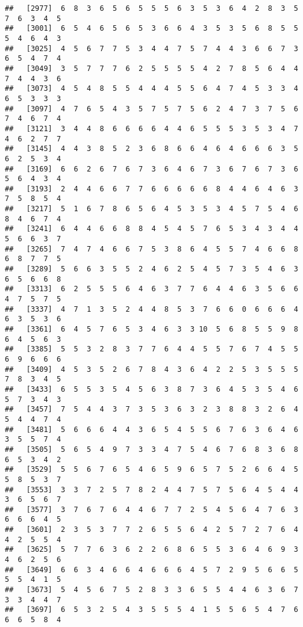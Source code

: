 \documentclass[
]{book}
\begin{document}
\begin{verbatim}
##   [2977]  6  8  3  6  5  6  5  5  5  6  3  5  3  6  4  2  8  3  5  7  6  3  4  5
##   [3001]  6  5  4  6  5  6  5  3  6  6  4  3  5  3  5  6  8  5  5  5  4  6  4  3
##   [3025]  4  5  6  7  7  5  3  4  4  7  5  7  4  4  3  6  6  7  3  6  5  4  7  4
##   [3049]  3  5  7  7  7  6  2  5  5  5  5  4  2  7  8  5  6  4  4  7  4  4  3  6
##   [3073]  4  5  4  8  5  5  4  4  4  5  5  6  4  7  4  5  3  3  4  6  5  3  3  3
##   [3097]  4  7  6  5  4  3  5  7  5  7  5  6  2  4  7  3  7  5  6  7  4  6  7  4
##   [3121]  3  4  4  8  6  6  6  6  4  4  6  5  5  5  3  5  3  4  7  4  6  2  7  7
##   [3145]  4  4  3  8  5  2  3  6  8  6  6  4  6  4  6  6  6  3  5  6  2  5  3  4
##   [3169]  6  6  2  6  7  6  7  3  6  4  6  7  3  6  7  6  7  3  6  5  6  4  3  4
##   [3193]  2  4  4  6  6  7  7  6  6  6  6  6  8  4  4  6  4  6  3  7  5  8  5  4
##   [3217]  5  1  6  7  8  6  5  6  4  5  3  5  3  4  5  7  5  4  6  8  4  6  7  4
##   [3241]  6  4  4  6  6  8  8  4  5  4  5  7  6  5  3  4  3  4  4  5  6  6  3  7
##   [3265]  7  4  7  4  6  6  7  5  3  8  6  4  5  5  7  4  6  6  8  6  8  7  7  5
##   [3289]  5  6  6  3  5  5  2  4  6  2  5  4  5  7  3  5  4  6  3  6  5  6  6  8
##   [3313]  6  2  5  5  5  6  4  6  3  7  7  6  4  4  6  3  5  6  6  4  7  5  7  5
##   [3337]  4  7  1  3  5  2  4  4  8  5  3  7  6  6  0  6  6  6  4  6  3  5  3  6
##   [3361]  6  4  5  7  6  5  3  4  6  3  3 10  5  6  8  5  5  9  8  6  4  5  6  3
##   [3385]  5  5  3  2  8  3  7  7  6  4  4  5  5  7  6  7  4  5  5  6  9  6  6  6
##   [3409]  4  5  3  5  2  6  7  8  4  3  6  4  2  2  5  3  5  5  5  7  8  3  4  5
##   [3433]  6  5  5  3  5  4  5  6  3  8  7  3  6  4  5  3  5  4  6  5  7  3  4  3
##   [3457]  7  5  4  4  3  7  3  5  3  6  3  2  3  8  8  3  2  6  4  5  4  4  7  4
##   [3481]  5  6  6  6  4  4  3  6  5  4  5  5  6  7  6  3  6  4  6  3  5  5  7  4
##   [3505]  5  6  5  4  9  7  3  3  4  7  5  4  6  7  6  8  3  6  8  6  5  3  4  2
##   [3529]  5  5  6  7  6  5  4  6  5  9  6  5  7  5  2  6  6  4  5  5  8  5  3  7
##   [3553]  3  3  7  2  5  7  8  2  4  4  7  5  7  5  6  4  5  4  4  3  6  5  6  7
##   [3577]  3  7  6  7  6  4  4  6  7  7  2  5  4  5  6  4  7  6  3  6  6  6  4  5
##   [3601]  2  3  5  3  7  7  2  6  5  5  6  4  2  5  7  2  7  6  4  4  2  5  5  4
##   [3625]  5  7  7  6  3  6  2  2  6  8  6  5  5  3  6  4  6  9  3  4  6  2  5  6
##   [3649]  6  6  3  4  6  6  4  6  6  6  4  5  7  2  9  5  6  6  5  5  5  4  1  5
##   [3673]  5  4  5  6  7  5  2  8  3  3  6  5  5  4  4  6  3  6  7  3  3  4  4  7
##   [3697]  6  5  3  2  5  4  3  5  5  5  4  1  5  5  6  5  4  7  6  6  6  5  8  4

\end{verbatim}
\end{document}
